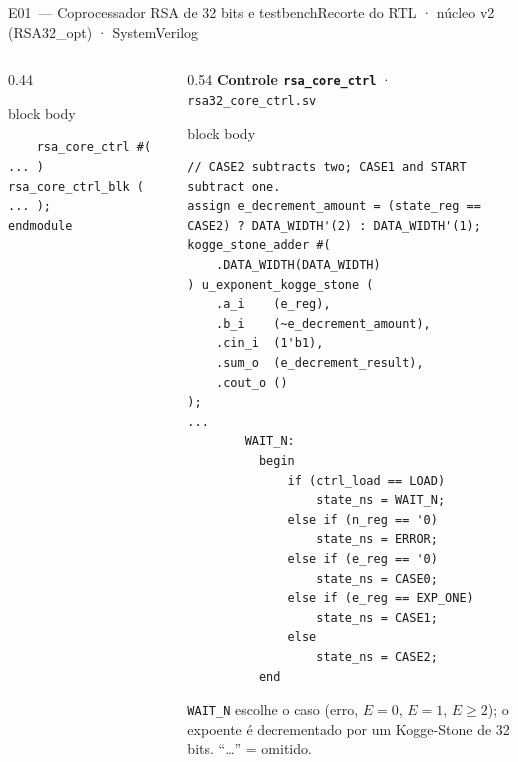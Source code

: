 \documentclass[aspectratio=169,10pt,t]{beamer}
\begin{document}
\begin{frame}[fragile]{E01~— Coprocessador RSA de 32 bits e testbench}{Recorte do RTL · núcleo v2 (RSA32\_opt) · SystemVerilog}
\begin{columns}[T]
\begin{column}{0.44\textwidth}
\begin{beamercolorbox}[rounded=true,shadow=false,sep=3pt]{block body}
\begin{verbatim}
    rsa_core_ctrl #( ... ) rsa_core_ctrl_blk ( ... );
endmodule
\end{verbatim}
\vspace*{-0.6\baselineskip}
      \end{beamercolorbox}
    \end{column}
    \begin{column}{0.54\textwidth}
      {\scriptsize\textbf{\color{tmCafe}Controle \texttt{rsa\_core\_ctrl}} · \texttt{rsa32\_core\_ctrl.sv}}\\[0.05cm]
      \tiny
      \begin{beamercolorbox}[rounded=true,shadow=false,sep=3pt]{block body}
\vspace*{-0.6\baselineskip}
\fontsize{4.7}{5.5}\selectfont
\begin{verbatim}
// CASE2 subtracts two; CASE1 and START subtract one.
assign e_decrement_amount = (state_reg == CASE2) ? DATA_WIDTH'(2) : DATA_WIDTH'(1);
kogge_stone_adder #(
    .DATA_WIDTH(DATA_WIDTH)
) u_exponent_kogge_stone (
    .a_i    (e_reg),
    .b_i    (~e_decrement_amount),
    .cin_i  (1'b1),
    .sum_o  (e_decrement_result),
    .cout_o ()
);
...
        WAIT_N:
          begin
              if (ctrl_load == LOAD)
                  state_ns = WAIT_N;
              else if (n_reg == '0)
                  state_ns = ERROR;
              else if (e_reg == '0)
                  state_ns = CASE0;
              else if (e_reg == EXP_ONE)
                  state_ns = CASE1;
              else
                  state_ns = CASE2;
          end
\end{verbatim}
\vspace*{-0.6\baselineskip}
      \end{beamercolorbox}
      {\tiny \texttt{WAIT\_N} escolhe o caso (erro, $E=0$, $E=1$, $E\geq2$); o expoente é decrementado por um Kogge-Stone de 32 bits. ``\dots'' = omitido.}
    \end{column}
  \end{columns}
\end{frame}

\end{document}

